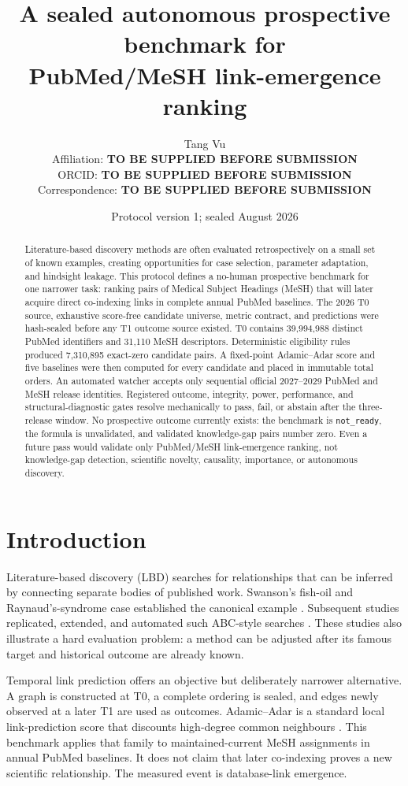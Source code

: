\documentclass[11pt]{article}
\title{A sealed autonomous prospective benchmark for\\PubMed/MeSH link-emergence ranking}
\author{Tang Vu\\
Affiliation: \textbf{TO BE SUPPLIED BEFORE SUBMISSION}\\
ORCID: \textbf{TO BE SUPPLIED BEFORE SUBMISSION}\\
Correspondence: \textbf{TO BE SUPPLIED BEFORE SUBMISSION}}
\date{Protocol version 1; sealed August 2026}
\begin{document}
\maketitle

\begin{abstract}
Literature-based discovery methods are often evaluated retrospectively on a small set of known
examples, creating opportunities for case selection, parameter adaptation, and hindsight leakage.
This protocol defines a no-human prospective benchmark for one narrower task: ranking pairs of
Medical Subject Headings (MeSH) that will later acquire direct co-indexing links in complete annual
PubMed baselines. The 2026 T0 source, exhaustive score-free candidate universe, metric contract,
and predictions were hash-sealed before any T1 outcome source existed. T0 contains 39,994,988
distinct PubMed identifiers and 31,110 MeSH descriptors. Deterministic eligibility rules produced
7,310,895 exact-zero candidate pairs. A fixed-point Adamic--Adar score and five baselines were then
computed for every candidate and placed in immutable total orders. An automated watcher accepts
only sequential official 2027--2029 PubMed and MeSH release identities. Registered outcome,
integrity, power, performance, and structural-diagnostic gates resolve mechanically to pass, fail,
or abstain after the three-release window. No prospective outcome currently exists: the benchmark
is \texttt{not\_ready}, the formula is unvalidated, and validated knowledge-gap pairs number zero.
Even a future pass would validate only PubMed/MeSH link-emergence ranking, not knowledge-gap
detection, scientific novelty, causality, importance, or autonomous discovery.
\end{abstract}

\section{Introduction}

Literature-based discovery (LBD) searches for relationships that can be inferred by connecting
separate bodies of published work. Swanson's fish-oil and Raynaud's-syndrome case established the
canonical example \cite{swanson1986}. Subsequent studies replicated, extended, and automated such
ABC-style searches \cite{gordon1996,weeber2001,preiss2017}. These studies also illustrate a hard
evaluation problem: a method can be adjusted after its famous target and historical outcome are
already known.

Temporal link prediction offers an objective but deliberately narrower alternative. A graph is
constructed at T0, a complete ordering is sealed, and edges newly observed at a later T1 are used
as outcomes. Adamic--Adar is a standard local link-prediction score that discounts high-degree
common neighbours \cite{adamic2003}. This benchmark applies that family to maintained-current MeSH
assignments in annual PubMed baselines. It does not claim that later co-indexing proves a new
scientific relationship. The measured event is database-link emergence.
\end{document}
